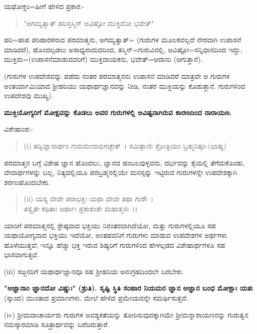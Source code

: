 ಯಥೋಕ್ತಂ=ಹೀಗೆ ಹೇಳಿದ ಪ್ರಕಾರ:-

\begin{verse}
"ಅಗಮ್ಯತ್ವಾತ್ ಹರಿಸ್ತಸ್ಮಿನ್ ಆವಿಷ್ಟೋ ಮುಕ್ತಿದೋ ಭವೇತ್"
\end{verse}

ಹರಿ=ಪಾಪ ಪರಿಹಾರಕನಾದ ಪರಮಾತ್ಮನು, ಅಗಮ್ಯತ್ವಾತ್= (ಗುರುಗಳ ಮೂಲಕವಲ್ಲದೆ ನೇರವಾಗಿ ಉಪಾಸನೆ ಮಾಡಿದರೆ), ಹೊಂದಲ್ಪಡಲು ಅಸಾಧ್ಯನಾದುದರಿಂದ, ತಸ್ಮಿನ್=ಗುರುವಿನಲ್ಲಿ, ಆವಿಷ್ಟೋ=ಸನ್ನಿಧಾನದಿಂದ ಇದ್ದು, ಮುಕ್ತಿದಃ=(ಉಪಾಸನೆಮಾಡುವವರಿಗೆ) ಮುಕ್ತಿದಾಯಕನು, ಭವೇತ್=ಆದಾನು (ಆಗುತ್ತಾನೆ).

(ಗುರುಗಳ ಉಪದೇಶವನ್ನು ಪಡೆದು ನಂತರ ಪರಮಾತ್ಮನನು ಉಪಾಸನೆ ಮಾಡಿದರೆ ಮಾತ್ರವೇ ಆ ಗುರುಗಳ ಅಂತರ್ಯಾಮಿಯಾದ ಶ‍್ರೀಹರಿಯು ಯಥಾರ್ಥಜ್ಞಾನವನ್ನು ನೀಡಿ, ನಂತರ ಮುಕ್ತಿಯನ್ನು ಕೊಡುತ್ತಾನೆ. ಗುರುಗಳಿಂದ ಉಪದೇಶವು ಮುಖ್ಯ).

\begin{center}
\textbf{ಮುಕ್ತಿಯೋಗ್ಯರಿಗೆ ಮೋಕ್ಷವನ್ನು ಕೊಡಲು ಅವರ ಗುರುಗಳಲ್ಲಿ ಅವಿಷ್ಟನಾಗಿರುವ ಕಾರಣದಿಂದ ನಾರಾಯಣ.}
\end{center}

\noindent
ವಿಶೇಷಾಂಶ:-

\begin{verse}
(i) ತದ್ವಿಜ್ಞಾನಾರ್ಥಂ ಗುರುಮೇವಾಭಿಗಚ್ಛೇತ್~। ಸಮಿತ್ಪಾಣಿಃ ಶ್ರೋತ್ರಿಯಂ ಬ್ರಹ್ಮನಿಷ್ಠಂ-(ಭಾಷ್ಯ)
\end{verse}

ಪರಮಾತ್ಮನ ಬಗ್ಗೆ ವಿಶೇಷ ಜ್ಞಾನ ಹೊಂದಲು, ಜ್ಞಾನದ ಹಂಬಲವುಳ್ಳವನು, ದರ್ಭವನ್ನು ಕೈಯಲ್ಲಿ ತೆಗೆದುಕೊಂಡು, ವೇದಾರ್ಥಗಳನ್ನು ಬಲ್ಲ, ನಿತ್ಯದಲ್ಲಿಯೂ ಪರಬ್ರಹ್ಮನಲ್ಲಿಯೇ ಮನಸ್ಸನ್ನು ಇಟ್ಟಿರುವ ಗುರುಗಳನ್ನೇ ಉಪದೇಶಕ್ಕಾಗಿ ಶರಣುಹೊಂದಬೇಕು.

\begin{verse}
(ii) ಯಸ್ಯ ದೇವೇ ಪರಾಭಕ್ತಿಃ ಯಥಾ ದೇವೇ ತಥಾ ಗುರೌ~।\\ ತಸ್ಯೈತೇ ಕಥಿತಾಃ ಅರ್ಥಾಃ ಪ್ರಕಾಶಂತೇ ಮಹಾತ್ಮನಃ~।।
\end{verse}


ಯಾರಿಗೆ ಪರಮಾತ್ಮನಲ್ಲಿ ಶ್ರೇಷ್ಠವಾದ ಭಕ್ತಿಯು ನಿರಂತರವಾಗಿದೆಯೋ, ಮತ್ತು ಗುರುಗಳಲ್ಲಿಯೂ ಸಹ ಯಥಾಯೋಗ್ಯವಾದ ಭಕ್ತಿಯು ಇದೆಯೋ, ಅಂತಹವನಿಗೆ ಗುರುಗಳು ಮಾಡುವ ಉಪದೇಶಗಳ ಅರ್ಥಗಳು ಹೊಳೆಯುತ್ತವೆ; ಇನ್ನೂ ಹೆಚ್ಚು ಭಕ್ತಿ ಇರುವ ಶಿಷ್ಯರಿಗೆ ಗುರುಗಳಿಂದ ಹೇಳಲ್ಪಡದ ವಿಶೇಷಾರ್ಥಗಳೂ ಸಹ ಭಾಸವಾಗುತ್ತವೆ.

(iii) ಸಜ್ಜನರಿಗೆ ಯಥಾರ್ಥಜ್ಞಾನವೂ ಸಹ ಶ‍್ರೀಹರಿಯ ಅನುಗ್ರಹದಿಂದಲೇ ಬರಬೇಕು.

\textbf{"ಅಜ್ಞಾನಾಂ ಜ್ಞಾನದೋ ವಿಷ್ಣುಃ" (ಶ್ರುತಿ). ಸೃಷ್ಟಿ ಸ್ಥಿತಿ ಸಂಹಾರ ನಿಯಮನ ಜ್ಞಾನ ಅಜ್ಞಾನ ಬಂಧ ಮೋಕ್ಷಾಃ ಯತಃ} (ಸ್ಕಾಂದ) ಮುಂತಾದ ಪ್ರಮಾಣಗಳು. ಮೇಲೆ ಹೇಳಿದ ಪ್ರಮೇಯವನ್ನೇ ಸಮರ್ಥಿಸುತ್ತವೆ.

(iv) ಶ‍್ರೀಮದಾಚಾರ್ಯರು ಗುರುಗಳ ಅವಶ್ಯಕತೆಯನ್ನು ತೋರಿಸುವುದಕ್ಕಾಗಿಯೇ ಶ‍್ರೀಮನ್ನಾರಾಯಣನನ್ನು ಗುರುತ್ವನ ನಮಸ್ಕಾರಮಾಡಿ ಸೂತ್ರಾರ್ಥವನ್ನು ಬರೆದಿರುತ್ತಾರೆ.

